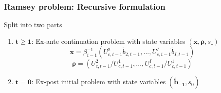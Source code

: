 \documentclass{beamer}
\begin{document}
\begin{frame}

\frametitle{Ramsey problem: Recursive formulation}

Split  into two parts

\begin{enumerate}

\item $\mathbf{t\geq1}$: Ex-ante continuation problem with state variables $(\bm{x},\bm{\rho},s\_)$
\[\bm{x}= \beta_{t-1}^{-1}\left( U_{c,t-1}^{2}\tilde{b}_{2,t-1},...,U_{c,t-1}^{I}\tilde{b}_{I,t-1}\right)\]
\[ \bm{\rho }=\left( U_{c,t-1}^{2}/U_{c,t-1}^{1},...,U_{c,t-1}^{I}/U_{c,t-1}^{1}\right) \]
\item $\mathbf{t=0} $: Ex-post initial problem with state variables $(\bm{\tilde{b}_{-1}},s_{0})$
\end{enumerate}

\end{frame}
\end{document}
